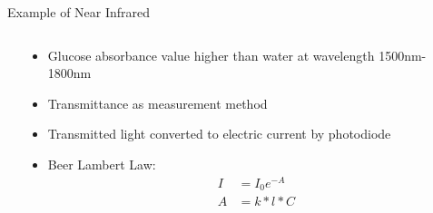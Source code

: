 \documentclass[fontsize=11pt,aspectratio=169,t,fleqn]{beamer}
\begin{document}
\begin{frame}{Example of Near Infrared}
    \begin{columns}[t]
        \begin{column}{.45\textwidth}
        \end{column}
        \begin{column}{.5\textwidth}
          \begin{itemize}
            \item Glucose absorbance value higher than water at wavelength 1500nm-1800nm
            \item Transmittance as measurement method
            \item Transmitted light converted to electric current by photodiode
            \item Beer Lambert Law: \begin{align} I&=I_0e^{-A}\\ A&=k*l*C \end{align}

          \end{itemize}
        \end{column}
    \end{columns}  
    
\end{frame}
\end{document}
